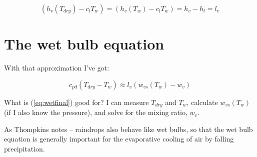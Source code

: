 \documentclass[12pt]{article}
\begin{document}
\begin{equation}
  \label{eq:latent}
(h_v(T_{dry}) - c_l T_w ) = (h_v(T_w) -  c_lT_w) = h_v - h_l = l_v
\end{equation}

\section{The wet bulb equation}
\label{sec:wet-bulb-equation}


With that approximation I've got:

\begin{equation}
  \label{eq:wetfinal}
  c_{pd} (T_{dry} - T_w) \approx  l_v ( w_{vs}(T_w) -w_v)
\end{equation}

What is (\ref{eq:wetfinal}) good for?  I can measure $T_{dry}$ and $T_w$, calculate
$w_{vs}(T_w)$ (if I also know the pressure), and solve for the
mixing ratio, $w_v$.

As Thompkins notes -- raindrops also behave like wet bulbs, so that the wet bulb equation is generally important for the evaporative cooling of air by falling precipitation.
\end{document}

